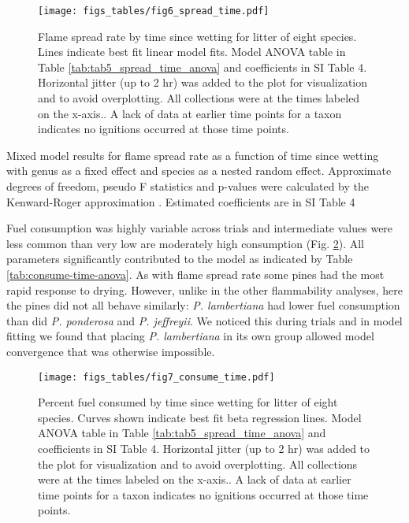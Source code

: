 \documentclass[fire,article,submit,moreauthors,pdftex]{Definitions/mdpi}
\begin{document}
\begin{figure}[H]
  \centering
\texttt{[image: figs\_tables/fig6\_spread\_time.pdf]}
\caption{Flame spread rate by time since wetting for litter of eight species.
  Lines indicate best fit linear model fits. Model ANOVA table in Table
  \ref{tab:tab5_spread_time_anova} and coefficients in SI Table 4. Horizontal
  jitter (up to 2 hr) was added to the plot for visualization and to avoid
  overplotting. All collections were at the times labeled on the x-axis.. A
  lack of data at earlier time points for a taxon indicates no ignitions
  occurred at those time points.}
  \label{fig:spread_time}
\end{figure}


\begin{table}[H]
  \caption[Mixed linear model of flame spread rate.]{Mixed model results for flame spread rate  as a function of time since wetting with genus as a fixed effect and species as a nested random effect. Approximate degrees of freedom, pseudo F statistics and p-values were calculated by the Kenward-Roger approximation \cite{Kenward_Roger-1997}. Estimated coefficients are in SI Table 4}
  \label{tab:spread_time_anova}
\centering

\end{table}

Fuel consumption was highly variable across trials and intermediate values were less common than very low are moderately high consumption (Fig. \ref{fig:spread_time}). All parameters significantly contributed to the model as indicated by Table \ref{tab:consume-time-anova}. As with flame spread rate some pines had the most rapid response to drying. However, unlike in the other flammability analyses, here the pines did not all behave similarly: \emph{P. lambertiana} had lower fuel consumption than did \emph{P. ponderosa} and \emph{P. jeffreyii}. We noticed this during trials and in model fitting we found that placing \emph{P. lambertiana} in its own group allowed model convergence that was otherwise impossible.

\begin{figure}[H]
  \centering
\texttt{[image: figs\_tables/fig7\_consume\_time.pdf]}
\caption{Percent fuel consumed by time since wetting for litter of eight
  species. Curves shown indicate best fit beta regression lines. Model ANOVA
  table in Table \ref{tab:tab5_spread_time_anova} and coefficients in SI Table
  4. Horizontal jitter (up to 2 hr) was added to the plot for visualization and
  to avoid overplotting. All collections were at the times labeled on the
  x-axis.. A lack of data at earlier time points for a taxon indicates no
  ignitions occurred at those time points.}
  \label{fig:spread_time}
\end{figure}
\end{document}
